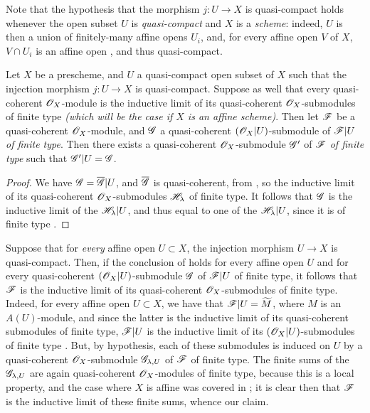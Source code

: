Note that the hypothesis that the morphism $j:U\to X$ is quasi-compact
holds whenever the open subset $U$ is \emph{quasi-compact} and $X$ is a
\emph{scheme}: indeed, $U$ is then a union of finitely-many affine opens $U_i$,
and, for every affine open $V$ of $X$, $V\cap U_i$ is an affine open , and
thus quasi-compact.

\begin{corollary}[9.4.3]
\label{I.9.4.3}
Let $X$ be a prescheme, and $U$ a quasi-compact open subset of $X$ such that the injection
morphism $j:U\to X$ is quasi-compact. Suppose as well that every quasi-coherent
$\mathscr{O}_X$-module is the inductive limit of its quasi-coherent $\mathscr{O}_X$-submodules of finite type
\emph{(which will be the case if $X$ is an \emph{affine scheme})}. Then let $\mathscr{F}$ be a
quasi-coherent $\mathscr{O}_X$-module, and $\mathscr{G}$ a quasi-coherent $(\mathscr{O}_X|U)$-submodule of $\mathscr{F}|U$ \emph{of finite type}. Then there exists a quasi-coherent $\mathscr{O}_X$-submodule $\mathscr{G}'$ of
$\mathscr{F}$ \emph{of finite type} such that $\mathscr{G}'|U=\mathscr{G}$.
\end{corollary}

\begin{proof}
We have $\mathscr{G}=\overline{\mathscr{G}}|U$, and $\overline{\mathscr{G}}$ is quasi-coherent, from
, so the inductive limit of its quasi-coherent $\mathscr{O}_X$-submodules
$\mathscr{H}_\lambda$ of finite type. It follows that $\mathscr{G}$ is the inductive limit of the
$\mathscr{H}_\lambda|U$, and thus equal to one of the $\mathscr{H}_\lambda|U$, since it is of finite
type .
\end{proof}

\begin{remark}[9.4.4]
\label{I.9.4.4}
Suppose that for \emph{every} affine open $U\subset X$, the injection morphism $U\to X$ is
quasi-compact. Then, if the conclusion of  holds for every affine open $U$
and for every quasi-coherent $(\mathscr{O}_X|U)$-submodule $\mathscr{G}$ of $\mathscr{F}|U$ of finite type, it
follows
that $\mathscr{F}$ is the inductive limit of its quasi-coherent $\mathscr{O}_X$-submodules of finite type.
Indeed, for every affine open $U\subset X$, we have that $\mathscr{F}|U=\widetilde{M}$, where $M$
is an $A(U)$-module, and since the latter is the inductive limit of its quasi-coherent
submodules of finite type, $\mathscr{F}|U$ is the inductive limit of its $(\mathscr{O}_X|U)$-submodules of
finite type . But, by hypothesis, each of these submodules is induced on $U$
by a quasi-coherent $\mathscr{O}_X$-submodule $\mathscr{G}_{\lambda,U}$ of $\mathscr{F}$ of finite type. The
finite sums of the $\mathscr{G}_{\lambda,U}$ are again quasi-coherent $\mathscr{O}_X$-modules of finite
type, because this is a local property, and the case where $X$ is affine was covered in
; it is clear then that $\mathscr{F}$ is the inductive limit of these finite
sums, whence our claim.
\end{remark}

